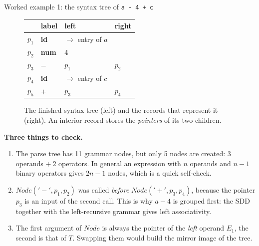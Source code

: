 \documentclass[11pt,a4paper]{article}
\newcommand{\tok}[1]{\ensuremath{\mathtt{#1}}}
\begin{document}
\begin{examplebox}{Worked example 1: the syntax tree of \texttt{a - 4 + c}}
\begin{figure}[H]
\centering
\begin{minipage}[c]{0.40\textwidth}
\centering
{}
\end{minipage}\hfill
\begin{minipage}[c]{0.50\textwidth}
\centering\small
\begin{tabular}{@{}c l l l@{}}
\toprule
 & \textbf{label} & \textbf{left} & \textbf{right} \\ \midrule
$p_1$ & \textbf{id}  & $\to$ entry of $a$ & \\
$p_2$ & \textbf{num} & 4 & \\
$p_3$ & $-$          & $p_1$ & $p_2$ \\
$p_4$ & \textbf{id}  & $\to$ entry of $c$ & \\
$p_5$ & $+$          & $p_3$ & $p_4$ \\ \bottomrule
\end{tabular}
\end{minipage}
\caption{The finished syntax tree (left) and the records that represent it (right). An interior record stores the \emph{pointers} of its two children.}
\end{figure}

\textbf{Three things to check.}
\begin{enumerate}[nosep]
\item The parse tree has 11 grammar nodes, but only 5 nodes are created: $3$ operands $+\ 2$ operators. In general an expression with $n$ operands and $n-1$ binary operators gives $2n-1$ nodes, which is a quick self-check.
\item $\mathit{Node}(\tok{'-'},p_1,p_2)$ was called \emph{before} $\mathit{Node}(\tok{'+'},p_3,p_4)$, because the pointer $p_3$ is an input of the second call. This is why $a-4$ is grouped first: the SDD together with the left-recursive grammar gives left associativity.
\item The first argument of $\mathit{Node}$ is always the pointer of the \emph{left} operand $E_1$, the second is that of $T$. Swapping them would build the mirror image of the tree.
\end{enumerate}
\end{examplebox}
\end{document}
